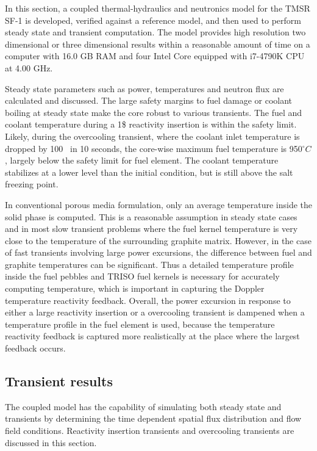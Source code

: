 \documentclass{elsarticle}
\begin{document}
In this section, a coupled thermal-hydraulics and neutronics model for the TMSR SF-1 is developed, verified against a reference model, and then used to perform steady state and transient computation. The model provides high resolution two dimensional or three dimensional results within a reasonable amount of time on a computer with 16.0 GB RAM and four Intel Core equipped with i7-4790K CPU at 4.00 GHz.

Steady state parameters such as power, temperatures and neutron flux are calculated and discussed. The large safety margins to fuel damage or coolant boiling at steady state make the core robust to various transients. 
The fuel and coolant temperature during a 1\$ reactivity insertion is within the safety limit.
Likely, during the overcooling transient, where the coolant inlet temperature is dropped by 100 \degc\ in 10 seconds, the core-wise maximum fuel temperature is 950$^{\circ}C$, largely below the safety limit for fuel element. The coolant temperature stabilizes at a lower level than the initial condition, but is still above the salt freezing point.

In conventional porous media formulation, only an average temperature inside the solid phase is computed. This is a reasonable assumption in steady state cases and in most slow transient problems where the fuel kernel temperature is very close to the temperature of the surrounding graphite matrix. However, in the case of fast transients involving large power excursions, the difference between fuel and graphite temperatures can be significant. Thus a detailed temperature profile inside the fuel pebbles and TRISO fuel kernels is necessary for accurately computing temperature, which is important in capturing the Doppler temperature reactivity feedback. %
Overall, the power excursion in response to either a large reactivity insertion or a overcooling transient is dampened when a temperature profile in the fuel element is used, because the temperature reactivity feedback is captured more realistically at the place where the largest feedback occurs. 

















\subsection{Transient results}
The coupled model has the capability of simulating both steady state and transients by determining the time dependent spatial flux distribution and flow field conditions. Reactivity insertion transients and overcooling transients are discussed in this section.
\end{document}
